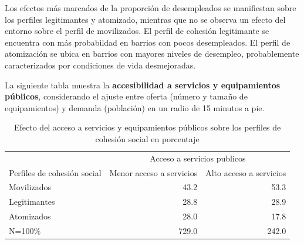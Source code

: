 \documentclass[
  12pt,
]{book}
\begin{document}
\begin{table}

\caption{\label{tab:clases-cesantes}Efecto de la proporción de trabajadores cesantes sobre los perfiles de cohesion social}
\centering
{}
\end{table}

Los efectos más marcados de la proporción de desempleados se manifiestan sobre los perfiles legitimantes y atomizado, mientras que no se observa un efecto del entorno sobre el perfil de movilizados. El perfil de cohesión legitimante se encuentra con más probabildad en barrios con pocos desempleados. El perfil de atomización se ubica en barrios con mayores niveles de desempleo, probablemente caracterizados por condiciones de vida desmejoradas.

La siguiente tabla muestra la \textbf{accesibilidad a servicios y equipamientos públicos}, considerando el ajuste entre oferta (número y tamaño de equipamientos) y demanda (población) en un radio de 15 minutos a pie.

\begin{table}

\caption{\label{tab:clases-accser}Efecto del acceso a servicios y equipamientos públicos sobre los perfiles de cohesión social en porcentaje}
\centering
\begin{tabular}[t]{l|r|r}
\hline
\multicolumn{1}{c|}{ } & \multicolumn{2}{c}{Acceso a servicios publicos} \\
\cline{2-3}
Perfiles de cohesión social & Menor acceso a servicios & Alto acceso a servicios\\
\hline
Movilizados & 43.2 & 53.3\\
\hline
Legitimantes & 28.8 & 28.9\\
\hline
Atomizados & 28.0 & 17.8\\
\hline
N=100\% & 729.0 & 242.0\\
\hline
\end{tabular}
\end{table}
\end{document}
